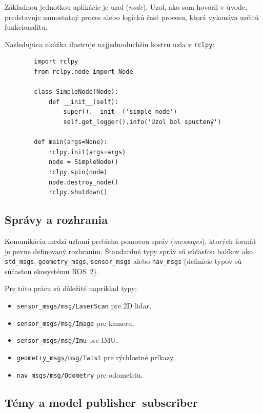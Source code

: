         Základnou jednotkou aplikácie je uzol (\emph{node}). Uzol, ako som hovoril v úvode, predstavuje samostatný proces alebo logickú časť procesu, ktorá vykonáva určitú funkcionalitu. 
      
        Nasledujúca ukážka ilustruje najjednoduchšiu kostru uzla v \texttt{rclpy}:
      
        \begin{verbatim}
        import rclpy
        from rclpy.node import Node
      
        class SimpleNode(Node):
            def __init__(self):
                super().__init__('simple_node')
                self.get_logger().info('Uzol bol spustený')
      
        def main(args=None):
            rclpy.init(args=args)
            node = SimpleNode()
            rclpy.spin(node)
            node.destroy_node()
            rclpy.shutdown()
        \end{verbatim}
      
        \subsection*{Správy a rozhrania}
      
        Komunikácia medzi uzlami prebieha pomocou správ (\emph{messages}), ktorých formát je pevne definovaný rozhraním. Štandardné typy správ sú súčasťou balíkov ako \texttt{std\_msgs}, \texttt{geometry\_msgs}, \texttt{sensor\_msgs} alebo \texttt{nav\_msgs} (definície typov sú súčasťou ekosystému ROS~2).
      
        Pre túto prácu sú dôležité napríklad typy:
        \begin{itemize}
            \item \texttt{sensor\_msgs/msg/LaserScan} pre 2D lidar,
            \item \texttt{sensor\_msgs/msg/Image} pre kameru,
            \item \texttt{sensor\_msgs/msg/Imu} pre IMU,
            \item \texttt{geometry\_msgs/msg/Twist} pre rýchlostné príkazy,
            \item \texttt{nav\_msgs/msg/Odometry} pre odometriu.
        \end{itemize}
      
        \subsection*{Témy a model publisher--subscriber}
      

